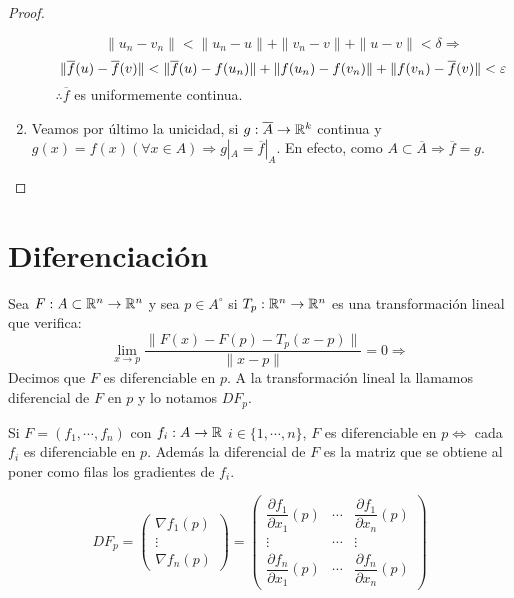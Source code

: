 \begin{theorem}
\begin{proof}
\begin{enumerate}
\begin{enumerate}
\begin{equation}
                      \|u_n - v_n\| < \|u_n - u\| + \|v_n - v\| + \|u - v\| < \delta \Rightarrow
                    \end{equation}
                    \begin{equation}
                      \|\overline{f}(u) - \overline{f}(v)\| < \|\overline{f}(u) - f(u_n)\| + \|f(u_n) - f(v_n)\| + \|f(v_n) - \overline{f}(v)\| < \varepsilon
                    \end{equation} $\therefore \overline{f}$ es uniformemente continua.
            \end{enumerate}
      \item Veamos por último la unicidad, si $g: \overline{A} \to \mathbb{R}^k$ continua y $g(x) = f(x) (\forall x \in A) \Rightarrow g|_A = \overline{f}|_A$. En efecto, como $A \subset \overline{A} \Rightarrow \overline{f} = g$.
    \end{enumerate}
  \end{proof}
\end{theorem}

\section{Diferenciación}

\begin{definition}
  Sea $F : A \subset \mathbb{R}^n \to \mathbb{R}^n$ y sea $p \in A^{\circ}$ si $T_p : \mathbb{R}^n \to \mathbb{R}^n$ es una transformación lineal que verifica:
  \begin{equation}
    \lim_{x \to p} \dfrac{\| F(x) - F(p) - T_p(x-p) \|}{\|x-p\|} = 0 \Rightarrow
  \end{equation} Decimos que $F$ es diferenciable en $p$. A la transformación lineal la llamamos diferencial de $F$ en $p$ y lo notamos $DF_p$.
\end{definition}

Si $F = (f_1, \cdots, f_n)$ con $f_i: A \to \mathbb{R}$ $i \in \{1, \cdots, n\}$, $F$ es diferenciable en $p \iff$ cada $f_i$ es diferenciable en $p$.
Además la diferencial de $F$ es la matriz que se obtiene al poner como filas los gradientes de $f_i$.

\begin{equation}
  DF_p = \begin{pmatrix}
    \nabla f_1(p) \\
    \vdots        \\
    \nabla f_n(p)
  \end{pmatrix} = \begin{pmatrix}
    \dfrac{\partial f_1}{\partial x_1}(p) & \cdots & \dfrac{\partial f_1}{\partial x_n}(p) \\
    \vdots                                & \cdots & \vdots                                \\
    \dfrac{\partial f_n}{\partial x_1}(p) & \cdots & \dfrac{\partial f_n}{\partial x_n}(p)
  \end{pmatrix}
\end{equation}

